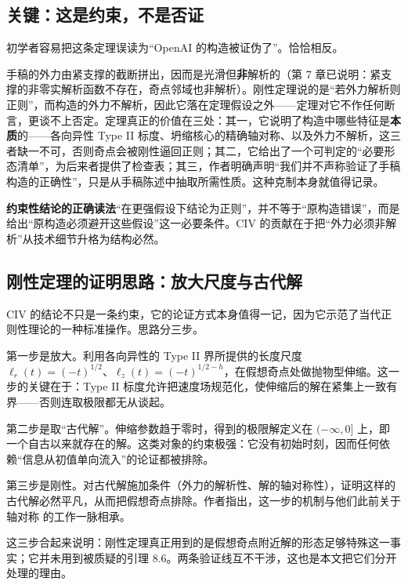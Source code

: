 \subsection{关键：这是约束，不是否证}

初学者容易把这条定理误读为“OpenAI 的构造被证伪了”。恰恰相反。

手稿的外力由紧支撑的截断拼出，因而是光滑但\textbf{非}解析的（第 7 章已说明：紧支撑的非零实解析函数不存在，奇点邻域也非解析）。刚性定理说的是“若外力解析则正则”，而构造的外力不解析，因此它落在定理假设之外——定理对它不作任何断言，更谈不上否定。定理真正的价值在三处：其一，它说明了构造中哪些特征是\textbf{本质}的——各向异性 Type II 标度、坍缩核心的精确轴对称、以及外力不解析，这三者缺一不可，否则奇点会被刚性逼回正则；其二，它给出了一个可判定的“必要形态清单”，为后来者提供了检查表；其三，作者明确声明“我们并不声称验证了手稿构造的正确性”，只是从手稿陈述中抽取所需性质。这种克制本身就值得记录。

\begin{principlebox}
\textbf{约束性结论的正确读法}\quad “在更强假设下结论为正则”，并不等于“原构造错误”，而是给出“原构造必须避开这些假设”这一必要条件。CIV 的贡献在于把“外力必须非解析”从技术细节升格为结构必然。
\end{principlebox}

\subsection{刚性定理的证明思路：放大尺度与古代解}

CIV 的结论不只是一条约束，它的论证方式本身值得一记，因为它示范了当代正则性理论的一种标准操作。思路分三步。

第一步是放大。利用各向异性的 Type II 界所提供的长度尺度 $\ell_{r}(t)=(-t)^{1/2}$、$\ell_{z}(t)=(-t)^{1/2-h}$，在假想奇点处做抛物型伸缩。这一步的关键在于：Type II 标度允许把速度场规范化，使伸缩后的解在紧集上一致有界——否则连取极限都无从谈起。

第二步是取“古代解”。伸缩参数趋于零时，得到的极限解定义在 $(-\infty,0]$ 上，即一个自古以来就存在的解。这类对象的约束极强：它没有初始时刻，因而任何依赖“信息从初值单向流入”的论证都被排除。

第三步是刚性。对古代解施加条件（外力的解析性、解的轴对称性），证明这样的古代解必然平凡，从而把假想奇点排除。作者指出，这一步的机制与他们此前关于轴对称 \NS{} 的工作一脉相承。

这三步合起来说明：刚性定理真正用到的是假想奇点附近解的形态足够特殊这一事实；它并未用到被质疑的引理 8.6。两条验证线互不干涉，这也是本文把它们分开处理的理由。

